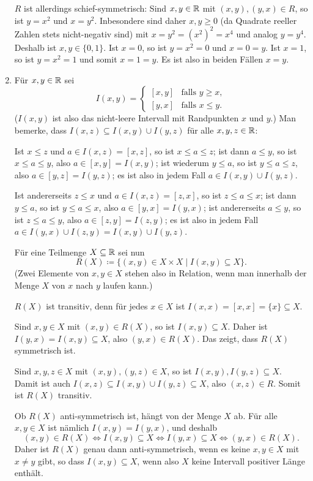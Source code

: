 \begin{bsp}
\begin{enumerate}[leftmargin=*]
   $R$ ist allerdings schief-symmetrisch: Sind $x, y \in \mathbb{R}$ mit $(x,y), (y,x) \in R$, so ist $y = x^2$ und $x = y^2$. Inbesondere sind daher $x,y \geq 0$ (da Quadrate reeller Zahlen stets nicht-negativ sind) mit $x = y^2 = (x^2)^2 = x^4$ und analog $y = y^4$. Deshalb ist $x, y \in \{0,1\}$. Ist $x = 0$, so ist $y = x^2 = 0$ und $x = 0 = y$. Ist $x = 1$, so ist $y = x^2 = 1$ und somit $x = 1 = y$. Es ist also in beiden Fällen $x = y$.
   
  \item
   Für $x,y \in \mathbb{R}$ sei
   \[
    I(x,y) =
    \begin{cases}
     [x,y] & \text{falls $y \geq x$}, \\
     [y,x] & \text{falls $x \leq y$}.
    \end{cases}
   \]
   ($I(x,y)$ ist also das nicht-leere Intervall mit Randpunkten $x$ und $y$.) Man bemerke, dass $I(x,z) \subseteq I(x,y) \cup I(y,z)$ für alle $x,y,z \in \mathbb{R}$:
   
   Ist $x \leq z$ und $a \in I(x,z) = [x,z]$, so ist $x \leq a \leq z$; ist dann $a \leq y$, so ist $x \leq a \leq y$, also $a \in [x,y] = I(x,y)$; ist wiederum $y \leq a$, so ist $y \leq a \leq z$, also $a \in [y,z] = I(y,z)$; es ist also in jedem Fall $a \in I(x,y) \cup I(y,z)$.
   
   Ist andererseits $z \leq x$ und $a \in I(x,z) = [z,x]$, so ist $z \leq a \leq x$; ist dann $y \leq a$, so ist $y \leq a \leq x$, also $a \in [y,x] = I(y,x)$; ist andererseits $a \leq y$, so ist $z \leq a \leq y$, also $a \in [z,y] = I(z,y)$;  es ist also in jedem Fall $a \in I(y,x) \cup I(z,y) = I(x,y) \cup I(y,z)$.
   
   Für eine Teilmenge $X \subseteq \mathbb{R}$ sei nun
   \[
    R(X) \coloneqq \{(x,y) \in X \times X \mid I(x,y) \subseteq X\}.
   \]
   (Zwei Elemente von $x,y \in X$ stehen also in Relation, wenn man innerhalb der Menge $X$ von $x$ nach $y$ laufen kann.)
   
   $R(X)$ ist transitiv, denn für jedes $x \in X$ ist $I(x,x) = [x,x] = \{x\} \subseteq X$.
   
   Sind $x,y \in X$ mit $(x,y) \in R(X)$, so ist $I(x,y) \subseteq X$. Daher ist $I(y,x) = I(x,y) \subseteq X$, also $(y,x) \in R(X)$. Das zeigt, dass $R(X)$ symmetrisch ist.
   
   Sind $x,y,z \in X$ mit $(x,y), (y,z) \in X$, so ist $I(x,y), I(y,z) \subseteq X$. Damit ist auch $I(x,z) \subseteq I(x,y) \cup I(y,z) \subseteq X$, also $(x,z) \in R$. Somit ist $R(X)$ transitiv.
   
   Ob $R(X)$ anti-symmetrisch ist, hängt von der Menge $X$ ab. Für alle $x,y \in X$ ist nämlich $I(x,y) = I(y,x)$, und deshalb
   \[
    (x,y) \in R(X)
    \iff I(x,y) \subseteq X
    \iff I(y,x) \subseteq X
    \iff (y,x) \in R(X).
   \]
   Daher ist $R(X)$ genau dann anti-symmetrisch, wenn es keine $x,y \in X$ mit $x \neq y$ gibt, so dass $I(x,y) \subseteq X$, wenn also $X$ keine Intervall positiver Länge enthält.
 \end{enumerate}
\end{bsp}





